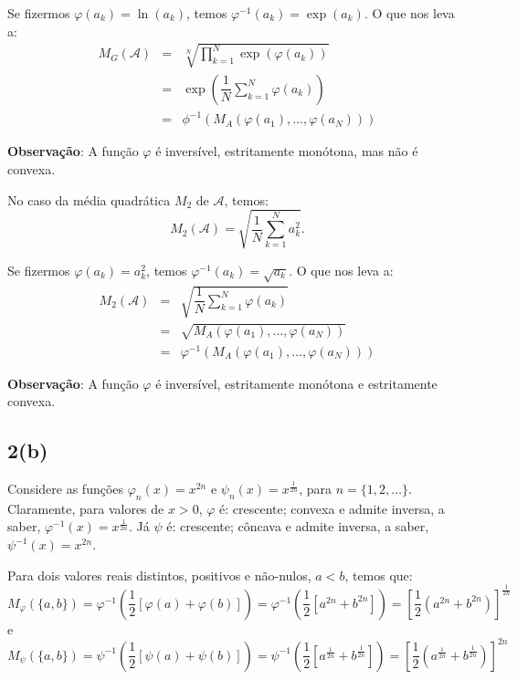 Se fizermos \(\varphi(a_k) = \ln(a_k)\), temos \(\varphi^{-1}(a_k) = \exp(a_k)\). O que nos leva a:
\[\begin{array}{rcl}
M_G(\mathcal{A})
&=& \displaystyle \sqrt[N]{\prod_{k=1}^{N} \exp(\varphi(a_{k}))} \\
&=& \displaystyle \exp\left(\dfrac{1}{N} \sum_{k=1}^{N} \varphi(a_k)\right) \\
&=& \phi^{-1}(M_A(\varphi(a_1), \ldots, \varphi(a_N)))
\end{array}\]

\textbf{Observação}: A função \(\varphi\) é inversível, estritamente monótona, mas não é convexa.


No caso da média quadrática \(M_2\) de \(\mathcal{A}\), temos:
\[
M_2(\mathcal{A})
= \displaystyle \sqrt{\dfrac{1}{N}\sum_{k=1}^{N} a_{k}^2}.
\]

Se fizermos \(\varphi(a_k) = a_k^2\), temos \(\varphi^{-1}(a_k) = \sqrt{a_k}\). O que nos leva a:
\[\begin{array}{rcl}
M_2(\mathcal{A})
&=& \displaystyle \sqrt{\dfrac{1}{N}\sum_{k=1}^{N} \varphi(a_{k})} \\
&=& \displaystyle \sqrt{M_A(\varphi(a_1), \ldots, \varphi(a_N))} \\
&=& \varphi^{-1}(M_A(\varphi(a_1), \ldots, \varphi(a_N)))
\end{array}\]

\textbf{Observação}: A função \(\varphi\) é inversível, estritamente monótona e estritamente convexa.





\subsection*{2(b)}


Considere as funções \(\varphi_n(x) = x^{2n}\) e \(\psi_n(x) = x^{\frac{1}{2n}}\), para \(n = \{1, 2, \ldots\}\). Claramente, para valores de \(x > 0\), \(\varphi\) é: crescente; convexa e admite inversa, a saber, \(\varphi^{-1}(x) = x^{\frac{1}{2n}}\). Já \(\psi\) é: crescente; côncava e admite inversa, a saber, \(\psi^{-1}(x) = x^{2n}\).

Para dois valores reais distintos, positivos e não-nulos, \(a < b\), temos que:
\[
M_\varphi(\{a,b\})
= \varphi^{-1}\left(\dfrac{1}{2}\left[\varphi(a)+\varphi(b)\right]\right)
= \varphi^{-1}\left(\dfrac{1}{2}\left[a^{2n}+b^{2n}\right]\right)
= \left[\dfrac{1}{2}\left(a^{2n}+b^{2n}\right)\right]^{\frac{1}{2n}}
\]
e
\[
M_\psi(\{a,b\})
= \psi^{-1}\left(\dfrac{1}{2}\left[\psi(a)+\psi(b)\right]\right)
= \psi^{-1}\left(\dfrac{1}{2}\left[a^{\frac{1}{2n}}+b^{\frac{1}{2n}}\right]\right)
= \left[\dfrac{1}{2}\left(a^{\frac{1}{2n}}+b^{\frac{1}{2n}}\right)\right]^{2n}
\]


